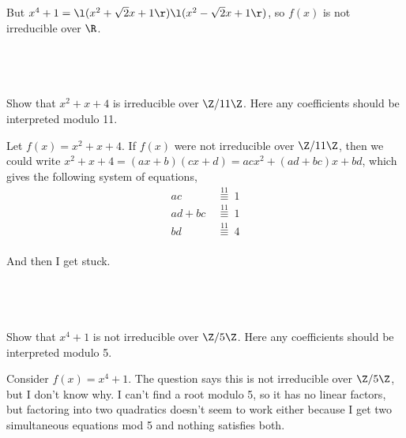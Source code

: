\documentclass[a4paper]{article}
\begin{document}
But $x^4 + 1 = \l(x^2 + \sqrt2 x + 1\r) \l(x^2 - \sqrt2 x + 1\r)$, so $f(x)$ is not irreducible over $\R$.

\subsection{~} %

\begin{questionbody}
Show that $x^2 + x + 4$ is irreducible over $\Z / 11\Z$. Here any coefficients should be interpreted modulo 11.
\end{questionbody}

Let $f(x) = x^2 + x + 4$. If $f(x)$ were not irreducible over $\Z / 11 \Z$, then we could write $x^2 + x + 4 = (ax + b) (cx + d) = acx^2 + (ad + bc)x + bd$, which gives the following system of equations, \begin{align*}
	ac &\stackrel{11}{\ \equiv\ } 1\\
	ad + bc &\stackrel{11}{\ \equiv\ } 1\\
	bd &\stackrel{11}{\ \equiv\ } 4\\
\end{align*}

And then I get stuck.

\newpage
\subsection{~} %

\begin{questionbody}
Show that $x^4 + 1$ is not irreducible over $\Z / 5\Z$. Here any coefficients should be interpreted modulo 5.
\end{questionbody}

Consider $f(x) = x^4 + 1$. The question says this is not irreducible over $\Z / 5 \Z$, but I don't know why. I can't find a root modulo 5, so it has no linear factors, but factoring into two quadratics doesn't seem to work either because I get two simultaneous equations mod 5 and nothing satisfies both.
\end{document}
